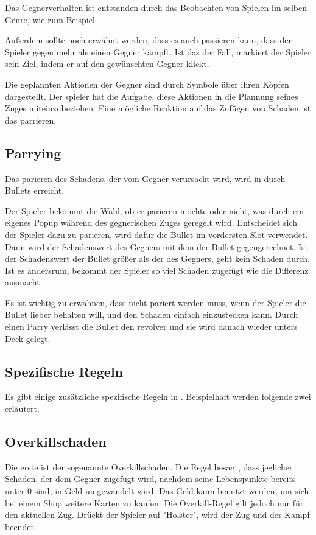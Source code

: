 Das Gegnerverhalten ist entstanden durch das Beobachten von Spielen im selben Genre, wie zum Beispiel . 


Außerdem sollte noch erwähnt werden, dass es auch passieren kann, dass der Spieler gegen mehr als einen Gegner kämpft.
Ist das der Fall, markiert der Spieler sein Ziel, indem er auf den gewünschten Gegner klickt.



Die geplannten Aktionen der Gegner sind durch Symbole über ihren Köpfen dargestellt. Der spieler hat die Aufgabe,
diese Aktionen in die Plannung seines Zuges miteinzubeziehen. Eine mögliche Reaktion auf das Zufügen von Schaden ist das parrieren.


\subsection{Parrying}\label{parrying}
Das parieren des Schadens, der vom Gegner verursacht wird, wird in \FF durch Bullets erreicht.


Der Spieler bekommt die Wahl, ob er parieren möchte oder nicht, was durch ein eigenes Popup während des gegnerischen Zuges geregelt wird.
Entscheidet sich der Spieler dazu zu parieren, wird dafür die Bullet im vordersten Slot verwendet.
Dann wird der Schadenswert des Gegners mit dem der Bullet gegengerechnet. Ist der Schadenswert der Bullet größer als der des Gegners,
geht kein Schaden durch. Ist es andersrum, bekommt der Spieler so viel Schaden zugefügt wie die Differenz ausmacht.


Es ist wichtig zu erwähnen, dass nicht pariert werden muss, wenn der Spieler die Bullet lieber behalten will, und den Schaden einfach einzustecken kann.
Durch einen Parry verlässt die Bullet den revolver und sie wird danach wieder unters Deck gelegt.


\subsection{Spezifische Regeln}\label{spezifische_regeln}

Es gibt einige zusätzliche spezifische Regeln in \FF. Beispielhaft werden folgende zwei erläutert.

\subsection{Overkillschaden}\label{Overkill}

Die erste ist der sogenannte Overkillschaden.
Die Regel besagt, dass jeglicher Schaden, der dem Gegner zugefügt wird, nachdem seine Lebenspunkte bereits unter 0 sind,
in Geld umgewandelt wird. Das Geld kann benutzt werden, um sich bei einem Shop weitere Karten zu kaufen.
Die Overkill-Regel gilt jedoch nur für den aktuellen Zug. Drückt der Spieler auf "Holster", wird der Zug und der Kampf beendet.


